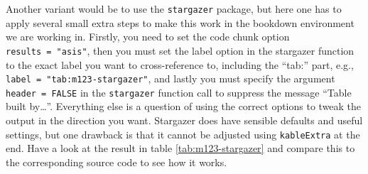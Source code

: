 \documentclass[
  11pt,
  a4paper,
  twoside]{scrbook}
\newenvironment{Shaded}{\begin{snugshade}}{\end{snugshade}}
\newcommand{\AttributeTok}[1]{\textcolor[rgb]{0.77,0.63,0.00}{#1}}
\newcommand{\ConstantTok}[1]{\textcolor[rgb]{0.00,0.00,0.00}{#1}}
\newcommand{\DecValTok}[1]{\textcolor[rgb]{0.00,0.00,0.81}{#1}}
\newcommand{\FloatTok}[1]{\textcolor[rgb]{0.00,0.00,0.81}{#1}}
\newcommand{\FunctionTok}[1]{\textcolor[rgb]{0.00,0.00,0.00}{#1}}
\newcommand{\NormalTok}[1]{#1}
\newcommand{\SpecialCharTok}[1]{\textcolor[rgb]{0.00,0.00,0.00}{#1}}
\newcommand{\StringTok}[1]{\textcolor[rgb]{0.31,0.60,0.02}{#1}}
\begin{document}
Another variant would be to use the \texttt{stargazer} package, but here one has to apply several small extra steps to make this work in the bookdown environment we are working in. Firstly, you need to set the code chunk option \texttt{results\ =\ "asis"}, then you must set the label option in the stargazer function to the exact label you want to cross-reference to, including the ``tab:'' part, e.g., \texttt{label\ =\ "tab:m123-stargazer"}, and lastly you must specify the argument \texttt{header\ =\ FALSE} in the \texttt{stargazer} function call to suppress the message ``Table built by\ldots{}''. Everything else is a question of using the correct options to tweak the output in the direction you want. Stargazer does have sensible defaults and useful settings, but one drawback is that it cannot be adjusted using \texttt{kableExtra} at the end. Have a look at the result in table \ref{tab:m123-stargazer} and compare this to the corresponding source code to see how it works.

\enlargethispage*{1cm}

\linespread{1}

\begin{Shaded}
\end{Shaded}
\end{document}
